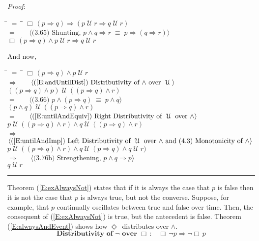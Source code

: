 \documentclass[12pt, fleqn, leqno]{article}
\newcommand{\lgap}{2pt}                             %
\newcommand{\mymathindent}{24pt}                    %
\newcommand{\equivs}{\ensuremath{\;\equiv\;}}       %
\newcommand{\impl}{\ensuremath{\Rightarrow}}        %
\newcommand{\Until}{\;\mathcal{U}\;}
\newcommand{\Event}{\Diamond\,}
\newcommand{\Always}{\Box\,}
\newcommand{\myqed}{\rule[-.23ex]{1.2ex}{2.0ex}}
\newcommand{\myqedtab}{\hspace{384pt}}              %
\newcommand{\Gll} {\langle}                         %
\newcommand{\Ggg} {\rangle}                         %
\newcommand{\Hint}[1]     {\ \ \ $\Gll              \mbox{#1} \Ggg$ }   %
\begin{document}
\emph{Proof}:
\begin{tabbing}
\hspace{\mymathindent} \= $= \;$ \= \myqedtab \= \kill
  \> \>   $\Always (p \impl q) \impl (p \Until r \impl q \Until r)$\\[\lgap]
  \> $=$  \>  \Hint{(3.65) Shunting, $p\land q \impl r \equivs p \impl (q \impl r)$}\\[\lgap]
  \> \>   $\Always (p \impl q) \land p \Until r \impl q \Until r$
\end{tabbing}
And now,
\begin{tabbing}
\hspace{\mymathindent} \= $= \;$ \= \myqedtab \= \kill
  \> \>   $\Always (p \impl q) \land p \Until r$\\[\lgap]
  \> $\impl$  \>  \Hint{(\ref{E:andUntilDist}) Distributivity of $\land$ over $\Until$}\\[\lgap]
  \> \>   $((p \impl q) \land p) \Until ((p \impl q) \land r)$\\[\lgap]
  \> $=$  \>  \Hint{(3.66) $p\land (p \impl q) \equivs  p \land q$}\\[\lgap]
  \> \>   $(p \land q) \Until ((p \impl q) \land r)$\\[\lgap]
  \> $=$  \>  \Hint{(\ref{E:untilAndEquiv}) Right Distributivity of $\Until$ over $\land$}\\[\lgap]
  \> \>   $p \Until ((p \impl q) \land r) \land q \Until ((p \impl q) \land r)$\\[\lgap]
  \> $\impl$  \>  \Hint{(\ref{E:untilAndImp}) Left Distributivity of $\Until$ over $\land$ and (4.3) Monotonicity of $\land$}\\[\lgap]
  \> \>   $p \Until ((p \impl q) \land r) \land q \Until (p \impl q) \land q \Until r)$\\[\lgap]
  \> $\impl$ \> \Hint{(3.76b) Strengthening, $p\land q \impl p$} \\[\lgap]
  \> \>   $q \Until r$ \quad \myqed
\end{tabbing}

Theorem (\ref{E:exAlwaysNot}) states that if it is always the case that $p$ is false then it is not the case that $p$ is always true, but not the converse.
Suppose, for example, that $p$ continually oscillates between true and false over time.
Then, the consequent of (\ref{E:exAlwaysNot}) is true, but the antecedent is false.
Theorem (\ref{E:alwaysAndEvent}) shows how $\Event$ distributes over $\land$.
\begin{equation}\label{E:exAlwaysNot}
\textbf{Distributivity of $\neg$ over $\Always$:}\quad \Always\neg p \impl \neg\Always p
\end{equation}
\end{document}
